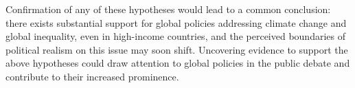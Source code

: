 

Confirmation of any of these hypotheses would lead to a common conclusion: there exists substantial support for global policies addressing climate change and global inequality, even in high-income countries, and the perceived boundaries of political realism on this issue may soon shift. %
Uncovering evidence to support the above hypotheses could %
draw attention to global policies in the public debate and contribute to their increased prominence. %

